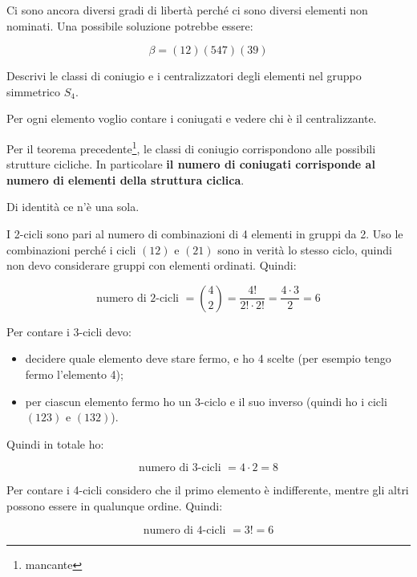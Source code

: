 Ci sono ancora diversi gradi di libertà perché ci sono diversi elementi non nominati. Una possibile soluzione potrebbe essere:

\begin{equation}
	\beta = (12)(547)(39)
\end{equation}

\begin{esercizio}
	Descrivi le classi di coniugio e i centralizzatori degli elementi nel gruppo simmetrico $S_4$.
\end{esercizio}
\begin{soluzione}
		
	Per ogni elemento voglio contare i coniugati e vedere chi è il centralizzante.

	Per il teorema precedente\footnote{mancante}, le classi di coniugio corrispondono alle possibili strutture cicliche. In particolare \textbf{il numero di coniugati corrisponde al numero di elementi della struttura ciclica}.
	
	Di identità ce n'è una sola.
	
	I 2-cicli sono pari al numero di combinazioni di 4 elementi in gruppi da 2. Uso le combinazioni perché i cicli $(12)$ e $(21)$ sono in verità lo stesso ciclo, quindi non devo considerare gruppi con elementi ordinati. Quindi:
	
	\begin{equation}
		\text{numero di 2-cicli } = \binom{4}{2} = \dfrac{4!}{2! \cdot 2!} = \dfrac{4 \cdot 3}{2} = 6
	\end{equation}

	Per contare i 3-cicli devo:
	
	\begin{itemize}
		\item decidere quale elemento deve stare fermo, e ho 4 scelte (per esempio tengo fermo l'elemento 4);
		\item per ciascun elemento fermo ho un 3-ciclo e il suo inverso (quindi ho i cicli $(123)$ e $(132)$).
	\end{itemize}

	Quindi in totale ho:
	
	\begin{equation}
		\text{numero di 3-cicli } = 4 \cdot 2 = 8
	\end{equation}

	Per contare i 4-cicli considero che il primo elemento è indifferente, mentre gli altri possono essere in qualunque ordine. Quindi:
	
	\begin{equation}
		\text{numero di 4-cicli } = 3! = 6
	\end{equation}


\end{soluzione}
